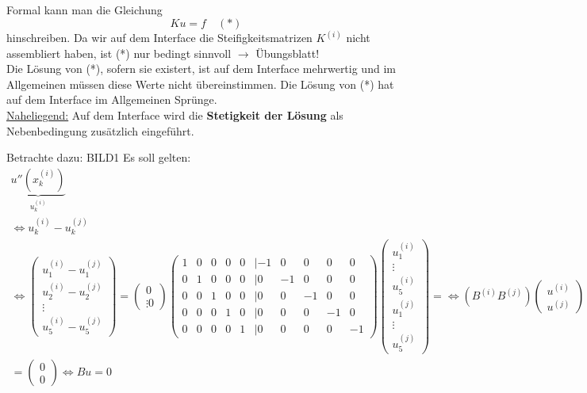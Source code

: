 Formal kann man die Gleichung 
\begin{equation}
Ku=f \quad (*)
\end{equation}
hinschreiben. Da wir auf dem Interface die Steifigkeitsmatrizen $K^{(i)}$ nicht assembliert haben, ist (*) nur bedingt sinnvoll $\rightarrow$ Übungsblatt!\\
Die Lösung von (*), sofern sie existert, ist auf dem Interface mehrwertig und im Allgemeinen müssen diese Werte nicht übereinstimmen. Die Lösung von (*) hat auf dem Interface im Allgemeinen Sprünge.\\

\underline{Naheliegend:} Auf dem Interface wird die \textbf{Stetigkeit der Lösung} als Nebenbedingung zusätzlich eingeführt.

Betrachte dazu:
BILD1
Es soll gelten: 
\begin{align}
  \underbrace{u''(x_k^{(i)})}_{u_k^{(i)}} &= \underbrace{u_k^{(j)}}_{u_k^{(j)}} \quad \forall k=1,\cdots ,5\\
  \Leftrightarrow u_k^{(i)} - u_k^{(j)} &= 0 \quad \forall k=1,\cdots ,5\\
  \Leftrightarrow 
  \begin{pmatrix}
    u_1^{(i)}-u_1^{(j)}\\
    u_2^{(i)}-u_2^{(j)}\\
    \vdots\\
    u_5^{(i)}-u_5^{(j)}  
  \end{pmatrix}
  =
  \begin{pmatrix}
    0\\ \vdots 0
  \end{pmatrix}
  \begin{pmatrix}
    1& 0& 0& 0& 0& | -1& 0& 0& 0& 0\\
    0& 1& 0& 0& 0& | 0& -1& 0& 0& 0\\
    0& 0& 1& 0& 0& | 0& 0& -1& 0& 0\\
    0& 0& 0& 1& 0& | 0& 0& 0& -1& 0\\
    0& 0& 0& 0& 1& | 0& 0& 0& 0& -1
  \end{pmatrix}
  \begin{pmatrix}
    u^{(i)}_1\\
    \vdots\\
    u^{(i)}_5\\
    u^{(j)}_1\\
    \vdots\\
    u^{(j)}_5
  \end{pmatrix}
  = 
  \Leftrightarrow
  (B^{(i)} B^{(j)}) %
  \begin{pmatrix}
    u^{(i)}\\
    u^{(j)}
  \end{pmatrix}\\
  =
  \begin{pmatrix}
    0\\
    0
  \end{pmatrix}
  \Leftrightarrow 
  Bu=0
\end{align}

